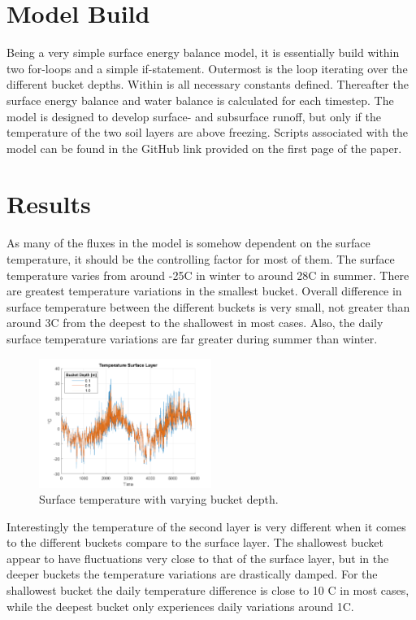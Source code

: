 \documentclass[a4paper,11pt,twocolumn]{article}
\begin{document}
\section{Model Build}

Being a very simple surface energy balance model, it is essentially build within two for-loops and a simple if-statement. Outermost is the loop iterating over the different bucket depths. Within is all necessary constants defined. Thereafter the surface energy balance and water balance is calculated for each timestep. The model is designed to develop surface- and subsurface runoff, but only if the temperature of the two soil layers are above freezing. Scripts associated with the model can be found in the GitHub link provided on the first page of the paper.         

\section{Results}

As many of the fluxes in the model is somehow dependent on the surface temperature, it should be the controlling factor for most of them. The surface temperature varies from around -25\textdegree C in winter to around 28\textdegree C in summer. There are greatest temperature variations in the smallest bucket. Overall difference in surface temperature between the different buckets is very small, not greater than around 3\textdegree C from the deepest to the shallowest in most cases. Also, the daily surface temperature variations are far greater during summer than winter.  

\begin{figure}[h]
	\centering 
	\includegraphics[width=0.5\textwidth]{figures/t_surface}
	\caption{Surface temperature with varying bucket depth.}
	\label{fig:t1}
\end{figure} 

Interestingly the temperature of the second layer is very different when it comes to the different buckets compare to the surface layer. The shallowest bucket appear to have fluctuations very close to that of the surface layer, but in the deeper buckets the temperature variations are drastically damped. For the shallowest bucket the daily temperature difference is close to 10 \textdegree C in most cases, while the deepest bucket only experiences daily variations around 1\textdegree C.     
\end{document}
